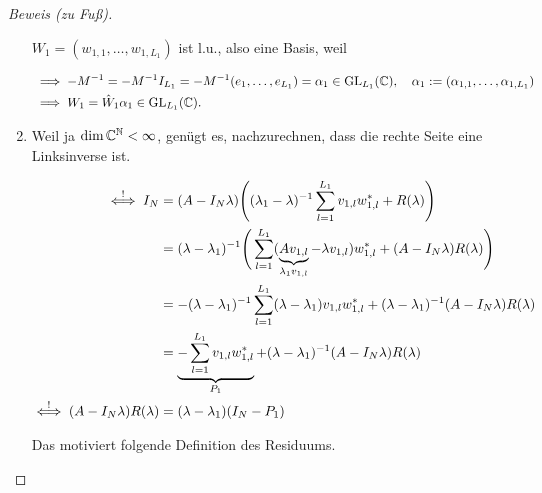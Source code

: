 \begin{proof}[Beweis (zu Fuß)]
\begin{enumerate}[label = (\roman*)]
        $W_1 = (w_{1, 1}, \dots, w_{1, L_1})$ ist l.u., also eine Basis, weil

        \begin{align*}
            & \implies
            -M^{-1} = -M^{-1} I_{L_1} = -M^{-1} (e_1, \dots, e_{L_1}) = \alpha_1 \in \operatorname{GL}_{L_1}(\mathbb{C}),
            \quad
            \alpha_1 := (\alpha_{1, 1}, \dots, \alpha_{1, L_1}) \\
            & \implies
            W_1 = \hat W_1 \alpha_1 \in \operatorname{GL}_{L_1}(\mathbb{C}).
        \end{align*}

        \item Weil ja $\dim \mathbb{C}^{\mathbb{N}} < \infty$, genügt es, nachzurechnen, dass die rechte Seite eine Linksinverse ist.
        
        \begin{align*}
            \stackrel{!}{\iff}
            I_N
            & =
            (A - I_N \lambda)
            {\left ( 
                (\lambda_1 - \lambda)^{-1}
                \sum_{l=1}^{L_1}
                    v_{1, l} w_{1, l}^\ast
                +
                R(\lambda)
             \right )} \\
            & =
            (\lambda - \lambda_1)^{-1}
            \Bigg (
                \sum_{l=1}^{L_1}
                    (
                        \underbrace{A v_{1, l}}_{\lambda_1 v_{1, l}}
                        -
                        \lambda v_{1, l}
                    )
                    w_{1, l}^\ast
                +
                (A - I_N \lambda) R(\lambda)
            \Bigg ) \\
            & =
            -(\lambda - \lambda_1)^{-1}
            \sum_{l=1}^{L_1}
                (\lambda - \lambda_1) v_{1, l} w_{1, l}^\ast
            +
            (\lambda - \lambda_1)^{-1}
            (A - I_N \lambda)
            R(\lambda) \\
            & =
            \underbrace
            {
                -\sum_{l=1}^{L_1}
                    v_{1, l} w_{1, l}^\ast
            }_{P_1}
            +
            (\lambda - \lambda_1)^{-1}
            (A - I_N \lambda)
            R(\lambda) \\
            \stackrel{!}{\iff}
            (A - I_N \lambda) R(\lambda)
            & =
            (\lambda - \lambda_1) (I_N - P_1)
        \end{align*}

        Das motiviert folgende Definition des Residuums.


\end{enumerate}
\end{proof}
